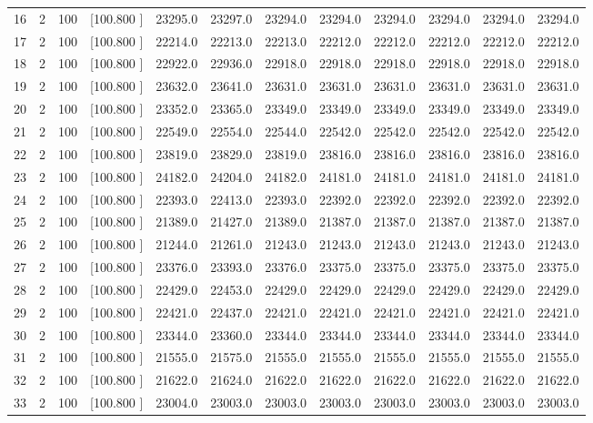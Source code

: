 \documentclass[12pt,a4paper]{article}
\begin{document}
\begin{center}
{\begin{tabular}{r r r r r r r r r r r r}
  16&  2&100&[100.800   ]& 23295.0& 23297.0& 23294.0& 23294.0& 23294.0& 23294.0& 23294.0& 23294.0\\[-0.02in]
  17&  2&100&[100.800   ]& 22214.0& 22213.0& 22213.0& 22212.0& 22212.0& 22212.0& 22212.0& 22212.0\\[-0.02in]
  18&  2&100&[100.800   ]& 22922.0& 22936.0& 22918.0& 22918.0& 22918.0& 22918.0& 22918.0& 22918.0\\[-0.02in]
  19&  2&100&[100.800   ]& 23632.0& 23641.0& 23631.0& 23631.0& 23631.0& 23631.0& 23631.0& 23631.0\\[-0.02in]
  20&  2&100&[100.800   ]& 23352.0& 23365.0& 23349.0& 23349.0& 23349.0& 23349.0& 23349.0& 23349.0\\[-0.02in]
  21&  2&100&[100.800   ]& 22549.0& 22554.0& 22544.0& 22542.0& 22542.0& 22542.0& 22542.0& 22542.0\\[-0.02in]
  22&  2&100&[100.800   ]& 23819.0& 23829.0& 23819.0& 23816.0& 23816.0& 23816.0& 23816.0& 23816.0\\[-0.02in]
  23&  2&100&[100.800   ]& 24182.0& 24204.0& 24182.0& 24181.0& 24181.0& 24181.0& 24181.0& 24181.0\\[-0.02in]
  24&  2&100&[100.800   ]& 22393.0& 22413.0& 22393.0& 22392.0& 22392.0& 22392.0& 22392.0& 22392.0\\[-0.02in]
  25&  2&100&[100.800   ]& 21389.0& 21427.0& 21389.0& 21387.0& 21387.0& 21387.0& 21387.0& 21387.0\\[-0.02in]
  26&  2&100&[100.800   ]& 21244.0& 21261.0& 21243.0& 21243.0& 21243.0& 21243.0& 21243.0& 21243.0\\[-0.02in]
  27&  2&100&[100.800   ]& 23376.0& 23393.0& 23376.0& 23375.0& 23375.0& 23375.0& 23375.0& 23375.0\\[-0.02in]
  28&  2&100&[100.800   ]& 22429.0& 22453.0& 22429.0& 22429.0& 22429.0& 22429.0& 22429.0& 22429.0\\[-0.02in]
  29&  2&100&[100.800   ]& 22421.0& 22437.0& 22421.0& 22421.0& 22421.0& 22421.0& 22421.0& 22421.0\\[-0.02in]
  30&  2&100&[100.800   ]& 23344.0& 23360.0& 23344.0& 23344.0& 23344.0& 23344.0& 23344.0& 23344.0\\[-0.02in]
  31&  2&100&[100.800   ]& 21555.0& 21575.0& 21555.0& 21555.0& 21555.0& 21555.0& 21555.0& 21555.0\\[-0.02in]
  32&  2&100&[100.800   ]& 21622.0& 21624.0& 21622.0& 21622.0& 21622.0& 21622.0& 21622.0& 21622.0\\[-0.02in]
  33&  2&100&[100.800   ]& 23004.0& 23003.0& 23003.0& 23003.0& 23003.0& 23003.0& 23003.0& 23003.0\\[-0.02in]

\end{tabular}}
\end{center}
\end{document}
